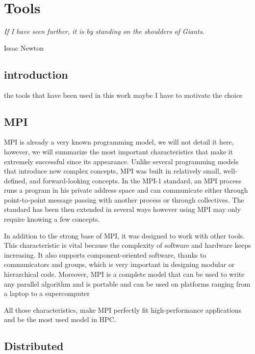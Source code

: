 \chapter{Tools}

\epigraph{\textit{If I have seen further, it is by standing on the shoulders of Giants.}} {Issac Newton}



\section{introduction}
the tools that have been used in this work 
maybe I have to motivate the choice

\section{MPI} 

MPI is already a very known programming model, we will not detail it here, however, we will summarize the most important characteristics that make it extremely successful since its appearance. Unlike several programming models that introduce new complex concepts, MPI was built in relatively small, well-defined, and forward-looking concepts\cite{traff_recent_2012}. In the MPI-1 standard, an MPI process runs a program in his private address space and can communicate either through point-to-point message passing with another process or through collectives. The standard has been then extended in several ways however using MPI may only require knowing a few concepts.   

In addition to the strong base of MPI, it was designed to work with other tools. This characteristic is vital because the complexity of software and hardware keeps increasing. It also supports component-oriented software, thanks to communicators and groups, which is very important in designing modular or hierarchical code. Moreover, MPI is a complete model that can be used to write any parallel algorithm and is portable and can be used on platforms ranging from a laptop to a supercomputer\cite{goos_learning_2001}   

All those characteristics, make MPI perfectly fit high-performance applications and be the most used model in HPC.

\section{\dask Distributed}\label{dask.distributed}
